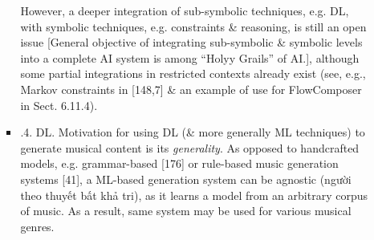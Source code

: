 \documentclass{article}
\begin{document}
\begin{itemize}
\begin{itemize}
\begin{itemize}
			However, a deeper integration of sub-symbolic techniques, e.g. DL, with symbolic techniques, e.g. constraints \& reasoning, is still an open issue [General objective of integrating sub-symbolic \& symbolic levels into a complete AI system is among ``Holyy Grails'' of AI.], although some partial integrations in restricted contexts already exist (see, e.g., Markov constraints in [148,7] \& an example of use for FlowComposer in Sect. 6.11.4).
			\item {.4. DL.} Motivation for using DL (\& more generally ML techniques) to generate musical content is its {\it generality}. As opposed to handcrafted models, e.g. grammar-based [176]  or rule-based music generation systems [41], a ML-based generation system can be agnostic (người theo thuyết bất khả tri), as it learns a model from an arbitrary corpus of music. As a result, same system may be used for various musical genres.


\end{itemize}
\end{itemize}
\end{itemize}
\end{document}
